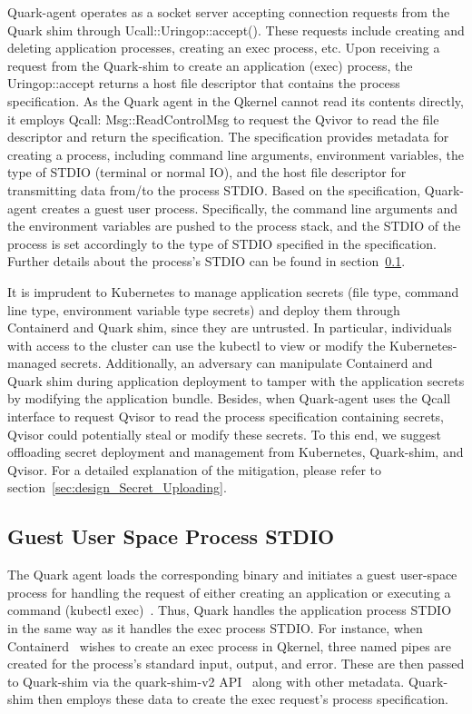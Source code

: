  Quark-agent operates as a socket server accepting connection requests from the Quark shim through Ucall::Uringop::accept(). These requests include creating and deleting application processes, creating an exec process, etc. Upon receiving a request 
 from the Quark-shim to create an application (exec) process, the Uringop::accept returns a host file descriptor that contains the process specification. As the Quark agent in the Qkernel cannot read its contents directly, it 
 employs Qcall: Msg::ReadControlMsg to request the Qvivor to read the file descriptor and return the specification. The specification provides metadata for creating a process, including command line arguments, environment variables, the type of 
 STDIO (terminal or normal IO), and the host file descriptor for transmitting data from/to the process STDIO. Based on the specification, Quark-agent creates a guest user process. Specifically, the command line arguments and the environment 
 variables are pushed to the process stack, and the STDIO of the process is set accordingly to the type of STDIO specified in the specification. Further details about the process’s STDIO can be found in section~\ref*{sec:security_analyse_STDIO}.


 It is imprudent to Kubernetes to manage application secrets (file type, command line type, environment variable type secrets) and deploy them through Containerd and Quark shim, since they are untrusted. In particular, individuals with access to 
 the cluster can use the kubectl to view or modify the Kubernetes-managed secrets. Additionally, an adversary can manipulate Containerd and Quark shim during application deployment to tamper with the application secrets by modifying the application 
 bundle. Besides, when Quark-agent uses the Qcall interface to request Qvisor to read the process specification containing secrets, Qvisor could potentially steal or modify these secrets. To this end, we suggest offloading secret deployment and 
 management from Kubernetes, Quark-shim, and Qvisor. For a detailed explanation of the mitigation, please refer to section~\ref*{sec:design_Secret_Uploading}.

\subsection{Guest User Space Process STDIO}
\label{sec:security_analyse_STDIO}

The Quark agent loads the corresponding binary and initiates a guest user-space process for handling the request of either creating an application or executing a command (kubectl exec)~\cite*{k8s}. Thus, Quark handles the application process STDIO 
in the same way as it handles the exec process STDIO. For instance, when Containerd~\cite*{containerd} wishes to create an exec process in Qkernel, three named pipes are created for the process's standard input, output, and error. These are then 
passed to Quark-shim via the quark-shim-v2 API~\cite*{shim_v2} along with other metadata. Quark-shim then employs these data to create the exec request's process specification. 


